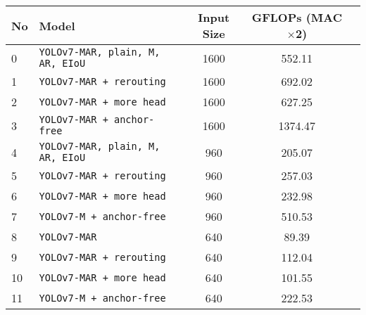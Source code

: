 \begin{tabular}{ l l c c c}
  \toprule[1.5pt]
  No & Model                                       &   Input Size         & GFLOPs (\~MAC$\times$2)         \\
  \midrule
  0  & \texttt{YOLOv7-MAR, plain, M, AR, EIoU}     &      1600            & 552.11   \\ 
  1  & \texttt{YOLOv7-MAR + rerouting}             &      1600            & 692.02   \\
  2  & \texttt{YOLOv7-MAR + more head}             &      1600            & 627.25   \\
  3  & \texttt{YOLOv7-MAR + anchor-free}           &      1600            & 1374.47  \\ 
  \midrule
  4  & \texttt{YOLOv7-MAR, plain, M, AR, EIoU}     &      960             & 205.07  \\
  5  & \texttt{YOLOv7-MAR + rerouting}             &      960             & 257.03   \\
  6  & \texttt{YOLOv7-MAR + more head}             &      960             & 232.98    \\
  7  & \texttt{YOLOv7-M + anchor-free}             &      960             & 510.53  \\
  \midrule
  8  & \texttt{YOLOv7-MAR}                         &      640             & 89.39   \\
  9  & \texttt{YOLOv7-MAR + rerouting}             &      640             & 112.04   \\
  10 & \texttt{YOLOv7-MAR + more head}             &      640             & 101.55   \\
  11 & \texttt{YOLOv7-M + anchor-free}             &      640             & 222.53   \\
  \bottomrule[1.5pt]
\end{tabular}
